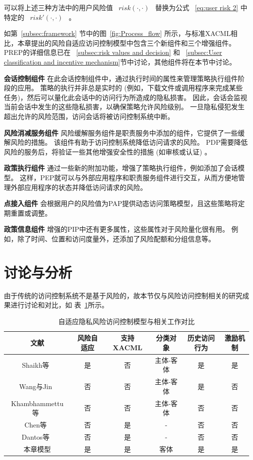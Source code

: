 可以将上述三种方法中的用户风险值 ~$risk(\cdot,\cdot)$~ 替换为公式 ~\ref{eq:user risk 2} 中特定的 ~$risk'(\cdot,\cdot)$~ 。


如第~\ref{subsec:framework} 节中的图~\ref{fig:Process_flow} 所示，与标准XACML相比，本章提出的风险自适应访问控制模型中包含三个新组件和三个增强组件。PREP的详细信息已在 ~\ref{subsec:risk values and decision} 和 ~\ref{subsec:User classification and incentive mechanism}节中讨论，其他组件将在本节中讨论。

\textbf{会话控制组件} 在此会话控制组件中，通过执行时间的属性来管理策略执行组件阶段的应用。 策略的执行并非总是实时的 (例如，下载文件或调用程序来完成某些任务)，然后可以量化此会话中的访问行为所造成的隐私损害。 因此，会话会监视当前会话中发生的这些隐私损害，以确保策略允许风险级别。 一旦隐私侵犯发生超出允许的风险范围，访问会话将被访问控制系统中断。

\textbf{风险消减服务组件} 风险缓解服务组件是职责服务中添加的组件，它提供了一些缓解风险的措施。 该组件有助于访问控制系统降低访问请求的风险。 PDP需要降低风险的服务后，将验证一些其他增强安全性的措施 (如审核或认证) 。

\textbf{政策执行组件} 通过一些新的附加功能，增强了策略执行组件，例如添加了会话模型。 这样，PEP就可以与外部应用程序和职责服务组件进行交互，从而方便地管理外部应用程序的状态并降低访问请求的风险。

\textbf{点接入组件} 会根据用户的风险值为PAP提供动态访问策略模型，且这些策略将定期重置或调整。

\textbf{政策信息组件} 增强的PIP中还有更多属性，这些属性对于风险量化很有用。 例如，除了时间、位置和访问度量外，还添加了风险配额和分组信息等。

\section{讨论与分析}
\label{sec:Discussion and analysis}
由于传统的访问控制系统不是基于风险的，故本节仅与风险访问控制相关的研究成果进行讨论和对比，如 表~\ref{tab:rabac-comparison}所示。

\begin{table}[htbp]
	\caption{自适应隐私风险访问控制模型与相关工作对比}
	\label{tab:rabac-comparison}
	\centering
	\small
	\begin{tabular}{cccccc}
		\toprule
		文献 & 风险自适应 & 支持XACML & 分类对象  & 历史访问行为 & 激励机制\\
		\midrule
		Shaikh等~\cite{shaikh2012dynamic} & 是 & 否 & 主体-客体 & 是 & 是 \\
		Wang与Jin~\cite{wang2011quantified}&否  &否  &主体-客体  &是  &否 \\
		Khambhammettu等~\cite{khambhammettu2013framework}&否  &否  &主体-客体  &否  &否 \\ 
		Chen等~\cite{chen2013xacml}& 否  &是  &-  &否  &否 \\ 
		Dantos等~\cite{santos2014dynamic}& 否  &是  &-  &否  &否 \\
		本章模型& 是 & 是 & 客体 & 是 & 是\\
		\bottomrule
	\end{tabular}
\end{table}


